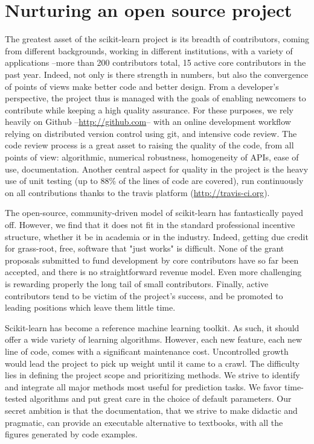 \documentclass[a4paper]{article}
\begin{document}
\section{Nurturing an open source project}

The greatest asset of the scikit-learn project is its breadth of
contributors, coming from different backgrounds, working in different
institutions, with a variety of applications --more than 200 contributors
total, 15 active core contributors in the past year. Indeed, not only
is there strength in numbers, but also the convergence of points of views
make better code and better design. From a developer's perspective, the
project thus is managed with the goals of enabling newcomers to
contribute while keeping a high quality assurance. For these purposes, we
rely heavily on Github --\url{http://github.com}-- with an online
development workflow relying on distributed version control using git,
and intensive code review. The code review process is a great asset to
raising the quality of the code, from all points of view: algorithmic,
numerical robustness, homogeneity of APIs, ease of use, documentation.
Another central aspect for quality in the project is the heavy use of
unit testing (up to 88\% of the lines of code are covered), run
continuously on all contributions thanks to the travis platform
(\url{http://travis-ci.org}).

The open-source, community-driven model of scikit-learn has fantastically
payed off. However, we find that it does not fit in the standard
professional incentive structure, whether it be in academia or in the
industry. Indeed, getting due credit for grass-root, free, software that
"just works" is difficult. None of the grant proposals submitted to fund
development by core contributors have so far been accepted, and there is
no straightforward revenue model. Even more challenging is rewarding
properly the long tail of small contributors. Finally, active
contributors tend to be victim of the project's success, and be promoted
to leading positions which leave them little time.

Scikit-learn has become a reference machine learning toolkit. As such, it
should offer a wide variety of learning algorithms. However, each new
feature, each new line of code, comes with a significant maintenance cost.
Uncontrolled growth would lead the project to pick up weight until it
came to a crawl. The difficulty lies in defining the project scope and
prioritizing methods. We strive to identify and integrate all major
methods most useful for prediction tasks. We favor time-tested
algorithms and put great care in the choice of default parameters. Our
secret ambition is that the documentation, that we strive to make
didactic and pragmatic, can provide an executable alternative to
textbooks, with all the figures generated by code examples.




\end{document}
